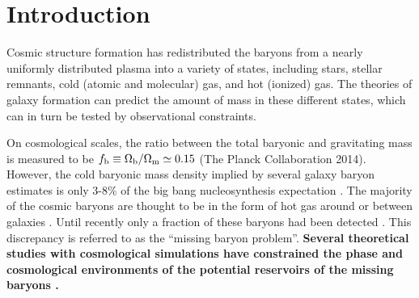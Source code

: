 \documentclass[useAMS,usenatbib]{mn2e}
\begin{document}
\setcounter{footnote}{1}


\section{Introduction}
\label{sec:intro}
Cosmic structure formation has redistributed the baryons from  a
nearly uniformly distributed plasma into a variety of states,
including stars, stellar remnants, cold (atomic and molecular) gas,
and hot (ionized) gas. The theories of galaxy formation can predict
the amount of mass in these different states, which can in turn be tested by
observational constraints.  

On cosmological scales, the ratio between the total baryonic and
gravitating mass is measured to be $f_{\rm b}\equiv \Omega_{\rm
  b}/\Omega_{\rm m}\simeq 0.15$ (The Planck Collaboration 2014).
However, the cold baryonic mass density implied by several galaxy baryon
estimates is only 3-8\% of the big bang nucleosynthesis expectation
\citep{Persic92, Fukugita98,  Bell03, McGaugh10}.  The majority of the
cosmic baryons are thought to be in the form of hot gas around or
between galaxies \citep{Cen09}. Until recently only a fraction of
these baryons had been detected \citep{Bregman07, Shull12}.  This
discrepancy is referred to as the ``missing baryon problem''.
{\bf Several theoretical studies with cosmological simulations
have constrained the phase and cosmological environments of
the potential reservoirs of the missing baryons 
\citep{Yoshida05, He05, Dave10, Zhu11, Haider16}.}
\end{document}
